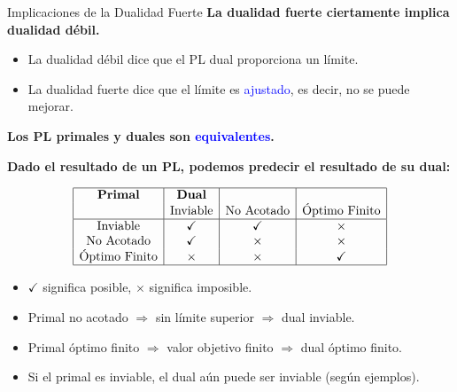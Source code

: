 \documentclass{beamer}
\begin{document}
\begin{frame}{Implicaciones de la Dualidad Fuerte}
    \textbf{La dualidad fuerte ciertamente implica dualidad débil.}
    
    \begin{itemize}
        \item La dualidad débil dice que el PL dual proporciona un límite.
        \item La dualidad fuerte dice que el límite es \textcolor{blue}{ajustado}, es decir, no se puede mejorar.
    \end{itemize}
    
    \vspace{0.3cm}
    \textbf{Los PL primales y duales son \textcolor{blue}{equivalentes}.}

    \vspace{0.3cm}
    \textbf{Dado el resultado de un PL, podemos predecir el resultado de su dual:}

    \[
    \begin{array}{|c|c|c|c|}
    \hline
    \textbf{Primal} & \textbf{Dual} & & \\
    & \text{Inviable} & \text{No Acotado} & \text{Óptimo Finito} \\
    \hline
    \text{Inviable} & \checkmark & \checkmark & \times \\
    \text{No Acotado} & \checkmark & \times & \times \\
    \text{Óptimo Finito} & \times & \times & \checkmark \\
    \hline
    \end{array}
    \]

    \vspace{0.5cm}
    \begin{itemize}
        \item \(\checkmark\) significa posible, \(\times\) significa imposible.
        \item Primal no acotado \(\Rightarrow\) sin límite superior \(\Rightarrow\) dual inviable.
        \item Primal óptimo finito \(\Rightarrow\) valor objetivo finito \(\Rightarrow\) dual óptimo finito.
        \item Si el primal es inviable, el dual aún puede ser inviable (según ejemplos).
    \end{itemize}
\end{frame}
\end{document}
